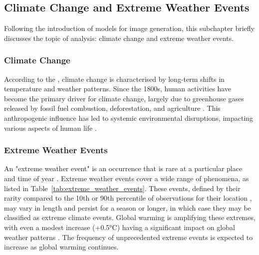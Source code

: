 \subsection{Climate Change and Extreme Weather Events}
Following the introduction of models for image generation, this subchapter briefly discusses the topic of analysis: climate change and extreme weather events.

\subsubsection{Climate Change}

According to the \textcite{UNClimateChange}, climate change is characterised by long-term shifts in temperature and weather patterns. Since the 1800s, human activities have become the primary driver for climate change, largely due to greenhouse gases released by fossil fuel combustion, deforestation, and agriculture \parencite{ipcc2023_wg2_1}. This anthropogenic influence has led to systemic environmental disruptions, impacting various aspects of human life \parencite{ipcc_2023_policy}.

\subsubsection{Extreme Weather Events}
An "extreme weather event" is an occurrence that is rare at a particular place and time of year \parencite[2908]{ipcc_2023_wg2_full}. Extreme weather events cover a wide range of phenomena, as listed in Table~\ref{tab:extreme_weather_events}. These events, defined by their rarity compared to the 10th or 90th percentile of observations for their location \parencite[2908]{ipcc_2023_wg2_full}, may vary in length and persist for a season or longer, in which case they may be classified as extreme climate events. Global warming is amplifying these extremes, with even a modest increase (+0.5°C) having a significant impact on global weather patterns \parencite[1583]{ipcc2023_wg1_11}. The frequency of unprecedented extreme events is expected to increase as global warming continues.

